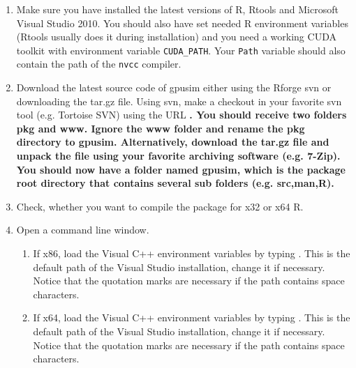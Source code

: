 \documentclass[11pt,oneside,a4paper]{article}
\begin{document}
\begin{enumerate}

		\item Make sure you have installed the latest versions of R, Rtools and Microsoft Visual Studio 2010. You should also have set needed R environment variables (Rtools usually does it during installation) and you need a working CUDA toolkit with environment variable \verb|CUDA_PATH|. Your \verb|Path| variable should also contain the path of the \verb|nvcc| compiler.

	\item Download the latest source code of gpusim either using the Rforge svn or downloading the tar.gz file. Using svn, make a checkout in your favorite svn tool (e.g. Tortoise SVN) using the URL \ttfamily \bfseries  {}\normalfont. You should receive two folders \ttfamily \textbf{pkg} \normalfont and \ttfamily \textbf{www}\normalfont. Ignore the \ttfamily \textbf{www} \normalfont folder and rename the \ttfamily \textbf{pkg} \normalfont directory to \ttfamily \textbf{gpusim}\normalfont. Alternatively, download the tar.gz file and unpack the file using your favorite archiving software (e.g. 7-Zip). You should now have a folder named gpusim, which is the package root directory that contains several sub folders (e.g. \ttfamily \textbf{src,man,R}\normalfont).
	
	\item Check, whether you want to compile the package for x32 or x64 R.
	
	\item Open a command line window.
	
	\begin{enumerate}[label={\alph*)}] 
	\item If x86, load the Visual C++ environment variables by typing . This is the default path of the Visual Studio installation, change it if necessary. Notice that the quotation marks are necessary if the path contains space characters. 
	
	\item If x64, load the Visual C++ environment variables by typing . This is the default path of the Visual Studio installation, change it if necessary. Notice that the quotation marks are necessary if the path contains space characters. 
	

\end{enumerate}
\end{enumerate}
\end{document}

